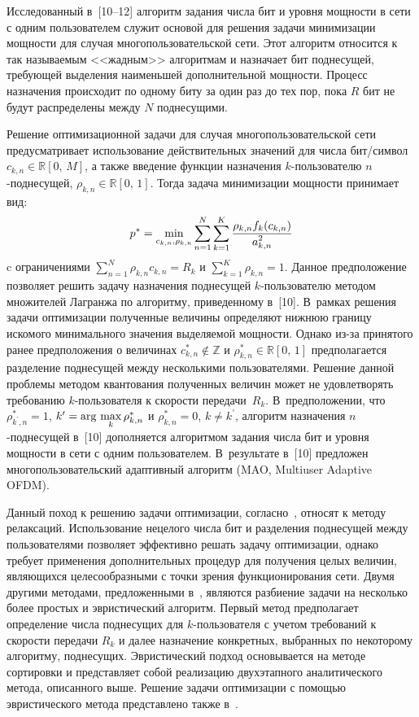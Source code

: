 \begin{multicols}{2}
  Исследованный в~[10--12] алгоритм задания чис\-ла бит и уровня мощности в сети с 
одним пользователем служит основой для решения задачи минимиза\-ции мощ\-ности для 
случая многопользовательской сети. Этот алгоритм относится к так называемым 
<<жад\-ным>> алгоритмам и назначает бит под\-не\-су\-щей, требующей выделения 
наименьшей дополнительной мощности. Процесс назначения происходит по одному биту 
за один раз до тех пор, пока $R$ бит не будут распределены между $N$ поднесущими.
  
  Решение оптимизационной задачи для случая многопользовательской сети 
предусматривает использование действительных значений для числа бит/символ 
$c_{k,n}\in \mathbb{R}[0,\,M]$, а также введение функции назначения $k$-поль\-зо\-ва\-те\-лю 
  $n$-под\-не\-су\-щей, $\rho_{k,n}\in \mathbb{R}[0,\,1]$. Тогда задача минимизации 
мощности принимает вид:
$$
p^*=\min\limits_{c_{k,n},\rho_{k,n}} \sum\limits_{n=1}^N 
\sum\limits_{k=1}^K \displaystyle\frac{\displaystyle \rho_{k,n} f_k(c_{k,n})\mathstrut}{\displaystyle a_{k,n}^2\mathstrut}
$$
c ограничениями $\sum\limits_{n=1}^N \rho_{k,n}c_{k,n}=R_k$ и $\sum\limits_{k=1}^K 
\rho_{k,n}=1$. Данное предположение позволяет решить задачу назначения поднесущей 
  $k$-пользователю методом множителей Лагранжа по алгоритму, приведенному в~[10]. 
В~рамках решения задачи оптимизации полученные величины определяют нижнюю 
границу искомого минимального значения выделяемой мощности. Однако из-за 
принятого ранее предположения о величинах $c^*_{k,n}\not\in \mathbb{Z}$ и 
$\rho_{k,n}^*\in \mathbb{R}[0,\,1]$ предполагается разделение поднесущей между 
несколькими пользователями. Решение данной проблемы методом квантования 
полученных величин может не удовлетворять требованию $k$-пользователя к скорости 
передачи~$R_k$. В~предположении, что $\rho_{k^\prime,n}^*=1$, 
$k^\prime\hm=\mathrm{arg}\,\max\limits_k \rho_{k,n}^*$ и $\rho^*_{k,n}=0$, 
$k\not=k^\prime$, алгоритм назначения $n$-поднесущей в~[10] дополняется алгоритмом 
задания числа бит и уровня мощности в сети с одним пользователем. В~результате в~[10] 
предложен многопользовательский адаптивный алгоритм (MAO, Multiuser Adaptive 
OFDM).
  
  Данный поход к решению задачи оптимизации, согласно~\cite{13-gai}, относят к 
методу релаксаций. Использование нецелого числа бит и разделения поднесущей между 
пользователями позволяет эффективно решать задачу оптимизации, однако требует 
применения дополнительных процедур для получения целых величин, являющихся 
целесообразными с точки зрения функционирования сети. Двумя другими методами, 
предложенными в~\cite{13-gai}, являются разбиение задачи на несколько более прос\-тых и 
эвристический алгоритм. Первый метод предполагает определение числа поднесущих для 
$k$-поль\-зо\-ва\-те\-ля с учетом требований к скорости передачи $R_k$ и далее назначение 
конкретных, выбранных по некоторому алгоритму, поднесущих. Эвристический подход 
основывается на методе сортировки и представляет собой реализацию двухэтапного 
аналитического метода, описанного выше. Решение задачи оптимизации с помощью 
эвристического метода представлено также в~\cite{14-gai}.


\end{multicols}
